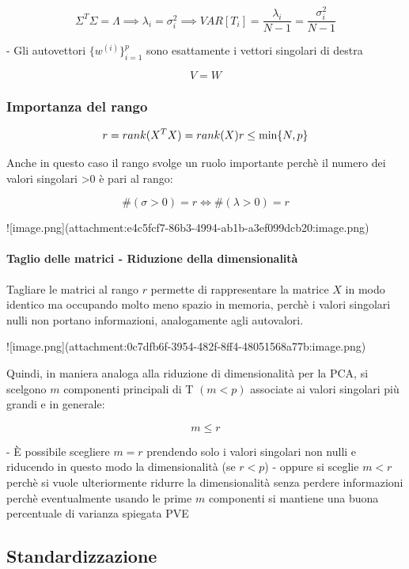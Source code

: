 $$
\Sigma^T\Sigma=\Lambda\implies\lambda_i=\sigma_i^2\implies VAR[T_i] = \frac{\lambda_i}{N-1} = \frac{\sigma_i^2}{N-1}
$$

- Gli autovettori $\{w^{(i)}\}_{i=1}^p$ sono esattamente i vettori singolari di destra

$$
V=W
$$


\subsubsection{Importanza del rango}

$$
r=rank(X^TX)=rank(X)\\ r \le \min\{N, p\}
$$

Anche in questo caso il rango svolge un ruolo importante perchè il numero dei valori singolari >0 è pari al rango:

$$
\#(\sigma>0)=r\iff\#(\lambda>0)=r
$$

![image.png](attachment:e4c5fcf7-86b3-4994-ab1b-a3ef099dcb20:image.png)

\paragraph{Taglio delle matrici - Riduzione della dimensionalità}

Tagliare le matrici al rango $r$ permette di rappresentare la matrice $X$ in modo identico ma occupando molto meno spazio in memoria, perchè i valori singolari nulli non portano informazioni, analogamente agli autovalori.

![image.png](attachment:0c7dfb6f-3954-482f-8ff4-48051568a77b:image.png)

Quindi, in maniera analoga alla riduzione di dimensionalità per la PCA, si scelgono $m$ componenti principali di T $(m<p)$ associate ai valori singolari più grandi e in generale:

$$
m\le r
$$

- È possibile scegliere $m=r$ prendendo solo i valori singolari non nulli e riducendo in questo modo la dimensionalità (se $r<p$)
- oppure si sceglie $m<r$ perchè si vuole ulteriormente ridurre la dimensionalità senza perdere informazioni perchè eventualmente usando le prime $m$ componenti si mantiene una buona percentuale di varianza spiegata PVE

\subsection{Standardizzazione}

